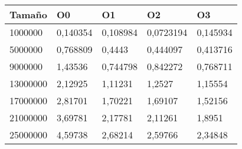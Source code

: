 \begin{tabular}{|l|l|l|l|l|}
	\hline
	Tamaño & O0 & O1 & O2 & O3 \\
	\hline
	\hline
	1000000 & 0,140354 & 0,108984 & 0,0723194 & 0,145934 \\
	\hline
	5000000 & 0,768809 & 0,4443 & 0,444097 & 0,413716 \\
	\hline
	9000000 & 1,43536 & 0,744798 & 0,842272 & 0,768711 \\
	\hline
	13000000 & 2,12925 & 1,11231 & 1,2527 & 1,15554 \\
	\hline
	17000000 & 2,81701 & 1,70221 & 1,69107 & 1,52156 \\
	\hline
	21000000 & 3,69781 & 2,17781 & 2,11261 & 1,8951 \\
	\hline
	25000000 & 4,59738 & 2,68214 & 2,59766 & 2,34848 \\
	\hline
\end{tabular}
